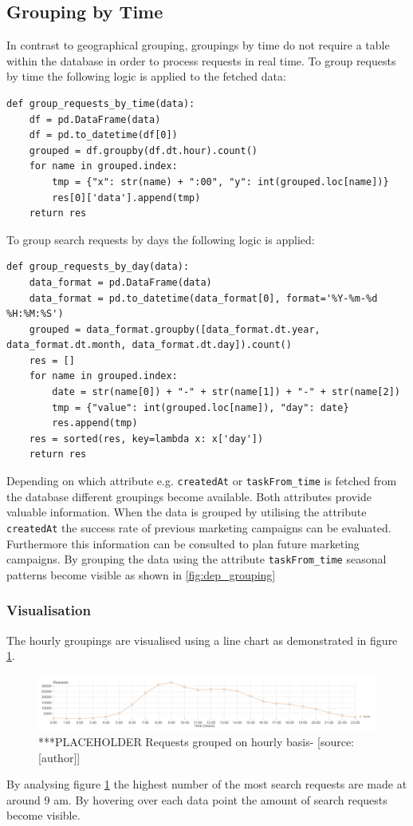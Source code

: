 \subsection{Grouping by Time}
In contrast to geographical grouping, groupings by time do not require a table within the database in order to process requests in real time. To group requests by time the following logic is applied to the fetched data: 
\begin{lstlisting}
def group_requests_by_time(data):
    df = pd.DataFrame(data)
    df = pd.to_datetime(df[0])
    grouped = df.groupby(df.dt.hour).count()
    for name in grouped.index:
        tmp = {"x": str(name) + ":00", "y": int(grouped.loc[name])}
        res[0]['data'].append(tmp)
    return res
\end{lstlisting}
To group search requests by days the following logic is applied: 
\begin{lstlisting}
def group_requests_by_day(data):
    data_format = pd.DataFrame(data)
    data_format = pd.to_datetime(data_format[0], format='%Y-%m-%d %H:%M:%S')
    grouped = data_format.groupby([data_format.dt.year, data_format.dt.month, data_format.dt.day]).count()
    res = []
    for name in grouped.index:
        date = str(name[0]) + "-" + str(name[1]) + "-" + str(name[2])
        tmp = {"value": int(grouped.loc[name]), "day": date}
        res.append(tmp)
    res = sorted(res, key=lambda x: x['day'])
    return res
\end{lstlisting}
Depending on which attribute e.g. \verb|createdAt| or \verb|taskFrom_time| is fetched from the database different groupings become available. Both attributes provide valuable information. When the data is grouped by utilising the attribute \verb|createdAt| the success rate of previous marketing campaigns can be evaluated. Furthermore this information can be consulted to plan future marketing campaigns. By grouping the data using the attribute \verb|taskFrom_time| seasonal patterns become visible as shown in \ref{fig:dep_grouping}
\subsubsection{Visualisation}
The hourly groupings are visualised using a line chart as demonstrated in figure \ref{fig:hourly_grouping}.
\begin{figure}[H]
	\centering
		\includegraphics[width=15cm]{images/requests_hour}
	\caption{***PLACEHOLDER Requests grouped on hourly basis- [source:[author]]}
	\label{fig:hourly_grouping}
\end{figure}
By analysing figure \ref{fig:hourly_grouping} the highest number of the most search requests are made at around 9 am. By hovering over each data point the amount of search requests become visible. 
\newline
 

